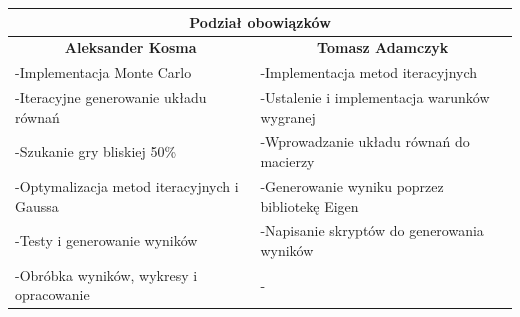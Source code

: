 \documentclass[8pt]{article}
\begin{document}
\renewcommand{\arraystretch}{1}
\begin{tabular}{ | p{8.2cm} | p{8.2cm} | }
  \hline
  \multicolumn{2}{|c|}{Podział obowiązków} \\
  \hline
  \multicolumn{1}{|c|}{\textbf{Aleksander Kosma} }& \multicolumn{1}{|c|}{\textbf{Tomasz Adamczyk}} \\
  \hline
  -Implementacja Monte Carlo & -Implementacja metod iteracyjnych \\\hline
   -Iteracyjne generowanie układu równań & -Ustalenie i implementacja warunków wygranej \\\hline
    -Szukanie gry bliskiej 50\% & -Wprowadzanie układu równań do macierzy \\\hline
  -Optymalizacja metod iteracyjnych i Gaussa & -Generowanie wyniku poprzez bibliotekę Eigen\\\hline
  -Testy i generowanie wyników & -Napisanie skryptów do generowania wyników \\\hline
  -Obróbka wyników, wykresy i opracowanie & - \\\hline
  
  \hline
\end{tabular}
\end{document}
